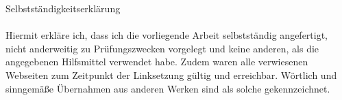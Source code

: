 \newpage
\Large{Selbstständigkeitserklärung}\\
\\
\small Hiermit erkläre ich,
dass ich die vorliegende Arbeit selbstständig angefertigt,
nicht anderweitig zu Prüfungszwecken vorgelegt und keine anderen,
als die angegebenen Hilfsmittel verwendet habe.
Zudem waren alle verwiesenen Webseiten zum Zeitpunkt der Linksetzung gültig und erreichbar.
Wörtlich und sinngemäße Übernahmen aus anderen Werken sind als solche gekennzeichnet.
\\
\newpage
